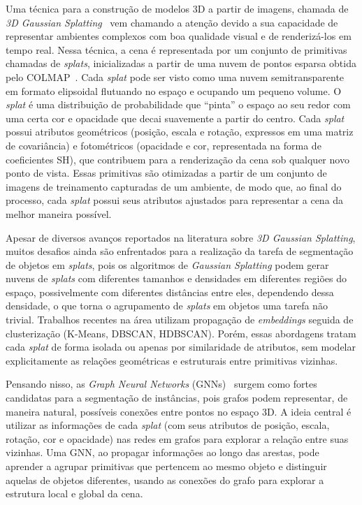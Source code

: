 Uma técnica para a construção de modelos 3D a partir de imagens, chamada de \emph{3D Gaussian Splatting}~\cite{kerbl20233d} vem chamando a atenção devido a sua capacidade de representar ambientes complexos com boa qualidade visual e de renderizá-los em tempo real. Nessa técnica, a cena é representada por um conjunto de primitivas chamadas de \emph{splats}, inicializadas a partir de uma nuvem de pontos esparsa obtida pelo COLMAP~\cite{Schonberger_2016_CVPR}. Cada \emph{splat} pode ser visto como uma nuvem semitransparente em formato elipsoidal flutuando no espaço e ocupando um pequeno volume. O \emph{splat} é uma distribuição de probabilidade que ``pinta'' o espaço ao seu redor com uma certa cor e opacidade que decai suavemente a partir do centro. Cada \emph{splat} possui atributos geométricos (posição, escala e rotação, expressos em uma matriz de covariância) e fotométricos (opacidade e cor, representada na forma de coeficientes SH), que contribuem para a renderização da cena sob qualquer novo ponto de vista. Essas primitivas são otimizadas a partir de um conjunto de imagens de treinamento capturadas de um ambiente, de modo que, ao final do processo, cada \emph{splat} possui seus atributos ajustados para representar a cena da melhor maneira possível.

Apesar de diversos avanços reportados na literatura sobre \emph{3D Gaussian Splatting}, muitos desafios ainda são enfrentados para a realização da tarefa de segmentação de objetos em \emph{splats}, pois os algoritmos de \emph{Gaussian Splatting} podem gerar nuvens de \emph{splats} com diferentes tamanhos e densidades em diferentes regiões do espaço, possivelmente com diferentes distâncias entre eles, dependendo dessa densidade, o que torna o agrupamento de \emph{splats} em objetos uma tarefa não trivial. Trabalhos recentes na área utilizam propagação de \emph{embeddings} seguida de clusterização (K-Means, DBSCAN, HDBSCAN). Porém, essas abordagens tratam cada \emph{splat} de forma isolada ou apenas por similaridade de atributos, sem modelar explicitamente as relações geométricas e estruturais entre primitivas vizinhas.

Pensando nisso, as \textit{Graph Neural Networks} (GNNs)~\cite{scarselli2008graph} surgem como fortes candidatas para a segmentação de instâncias, pois grafos podem representar, de maneira natural, possíveis conexões entre pontos no espaço 3D. A ideia central é utilizar as informações de cada \emph{splat} (com seus atributos de posição, escala, rotação, cor e opacidade) nas redes em grafos para explorar a relação entre suas vizinhas. Uma GNN, ao propagar informações ao longo das arestas, pode aprender a agrupar primitivas que pertencem ao mesmo objeto e distinguir aquelas de objetos diferentes, usando as conexões do grafo para explorar a estrutura local e global da cena.

